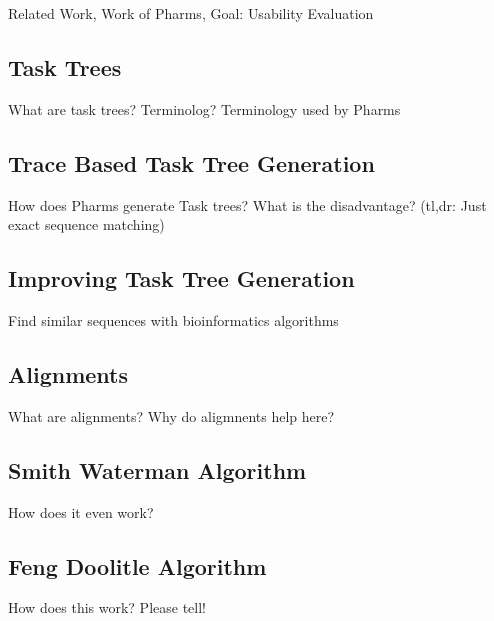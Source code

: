 Related Work, Work of Pharms, Goal: Usability Evaluation \citep{harms2013}
\subsection{Task Trees}
What are task trees? Terminolog? Terminology used by Pharms
\subsection{Trace Based Task Tree Generation}
How does Pharms generate Task trees? What is the disadvantage? (tl,dr: Just exact sequence matching)

\subsection{Improving Task Tree Generation}
Find similar sequences with bioinformatics algorithms

\subsection{Alignments}
What are alignments? Why do aligmnents help here?

\subsection{Smith Waterman Algorithm}
How does it even work?

\subsection{Feng Doolitle Algorithm}
How does this work? Please tell!



